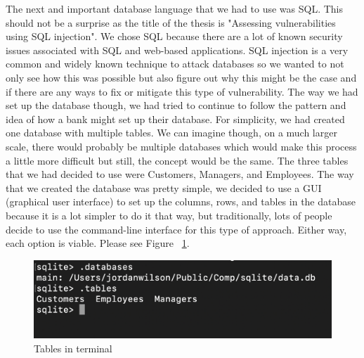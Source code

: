 The next and important database language that we had to use was SQL. This should not
be a surprise as the title of the thesis is "Assessing vulnerabilities using
SQL injection". We chose SQL because there are a lot of known security issues associated
with SQL and web-based applications. SQL injection is a very common and widely known
technique to attack databases so we wanted to not only see how this was possible
but also figure out why this might be the case and if there are any ways to fix
or mitigate this type of vulnerability. The way we had set up the database though, we had
tried to continue to follow the pattern and idea of how a bank might set up their database.
For simplicity, we had created one database with multiple tables. We can imagine though,
on a much larger scale, there would probably be multiple databases which would make this
process a little more difficult but still, the concept would be the same. The three
tables that we had decided to use were Customers, Managers, and Employees. The way
that we created the database was pretty simple, we decided to use a GUI (graphical user
interface) to set up the columns, rows, and tables in the database because it is a lot
simpler to do it that way, but traditionally, lots of people decide to use the command-line interface for this type of approach. Either way, each option is viable. Please see Figure ~\ref{fig:tables in terminal}.

\bigskip
\bigskip
\begin{figure}[hbt!]
\centering
\includegraphics[width=5in]{../images/sql-terminal.png}%
\caption{Tables in terminal}
\label{fig:tables in terminal}
\end{figure}
\bigskip
\bigskip



